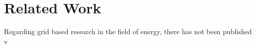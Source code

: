 \chapter{Related Work}
\label{ch:RW}




Regarding grid based research in the field of energy, there has not been published v\\



